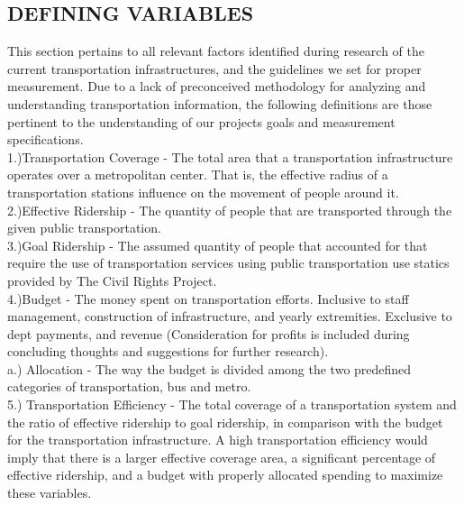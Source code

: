 \documentclass[12pt]{article}
\begin{document}
\begin{multicols}{2}
	
\section{DEFINING VARIABLES}
This section pertains to all relevant factors identified during research of the current transportation infrastructures, and the guidelines we set for proper measurement. Due to a lack of preconceived methodology for analyzing and understanding transportation information, the following definitions are those pertinent to the understanding of our projects goals and measurement specifications.\\
1.)Transportation Coverage - The total area that a transportation infrastructure operates over a metropolitan center. That is, the effective radius of a transportation stations influence on the movement of people around it.\\
2.)Effective Ridership - The quantity of people that are transported through the given public transportation.\\
3.)Goal Ridership - The assumed quantity of people that accounted for that require the use of transportation services using public transportation use statics provided by The Civil Rights Project.\\
4.)Budget - The money spent on transportation efforts. Inclusive to staff management, construction of infrastructure, and yearly extremities. Exclusive to dept payments, and revenue (Consideration for profits is included during concluding thoughts and suggestions for further research).\\
	a.) Allocation - The way the budget is divided among the two predefined categories of transportation, bus and metro.\\
5.) Transportation Efficiency - The total coverage of a transportation system and the ratio of effective ridership to goal ridership, in comparison with the budget for the transportation infrastructure. A high transportation efficiency would imply that there is a larger effective coverage area, a significant percentage of effective ridership, and a budget with properly allocated spending to maximize these variables.

\end{multicols}
\end{document}
